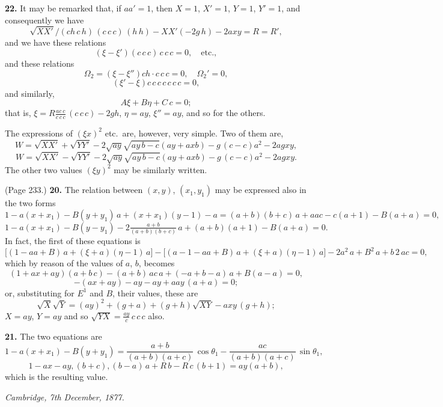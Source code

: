 \documentclass[11pt,a4paper]{book}
\begin{document}
\medskip

\noindent\textbf{22.} It may be remarked that, if $a a' = 1$, then $X = 1$, $X' = 1$, $Y = 1$, $Y' = 1$, and consequently we have
\[
\sqrt{X X'}/(c h\,c\,h)\,(c\,c\,c)\,(h\,h) - X X' (- 2 g\,h) - 2 a x y = R = R',
\]
and we have these relations
\[
(\xi - \xi')(c\,c\,c)\,c\,c\,c = 0, \quad \text{etc.},
\]
and these relations
\[
\Omega_2 = (\xi - \xi'') c h \cdot c\,c\,c = 0, \quad \Omega_2' = 0,
\]
\[
(\xi' - \xi) c\,c\,c\,c\,c\,c\,c = 0,
\]
and similarly,
\[
A\xi + B \eta + C\,c = 0;
\]
that is, $\xi = R \frac{a c\,c}{c\,c\,c}\,(c\,c\,c) - 2 g h$, $\eta = a y$, $\xi'' = a y$, and so for the others.

The expressions of $(\xi x)^2$ etc.\ are, however, very simple. Two of them are,
\[
W = \sqrt{X X'} + \sqrt{Y Y'} - 2 \sqrt{a y}\sqrt{a y\,b - c} (a y + a x b) - g\,(c - c) a^2 - 2 a g x y,
\]
\[
W = \sqrt{X X'} - \sqrt{Y Y'} - 2 \sqrt{a y}\sqrt{a y\,b - c} (a y + a x b) - g\,(c - c) a^2 - 2 a g x y.
\]
The other two values $(\xi y)^2$ may be similarly written.

\medskip

\noindent (Page 233.) \textbf{20.} The relation between $(x, y)$, $(x_1, y_1)$ may be expressed also in the two forms
\[
1 - a (x + x_1) - B (y + y_1)\, a + (x + x_1)(y - 1) - a = (a + b)(b + c)\,a + a a c - c (a + 1) - B(a + a) = 0,
\]
\[
1 - a (x + x_1) - B (y - y_1) - 2 \tfrac{a + b}{(a + b)(b + c)}\,a + (a + b)(a + 1) - B (a + a) = 0.
\]
In fact, the first of these equations is
\[
\big[(1 - aa + B)\,a + (\xi + a)(\eta - 1)\,a\big] - \big[(a - 1 - a a + B)\,a + (\xi + a)(\eta - 1)\,a\big] - 2 a^2\,a + B^2\,a + b\,2\,a c = 0,
\]
which by reason of the values of $a$, $b$, becomes
\[
(1 + a x + a y)(a + b\,c) - (a + b)\,a c\,a + (- a + b - a)\,a + B (a - a) = 0,
\]
\[
- (a x + a y) - a y - a y + a a y\,(a + a) = 0;
\]
or, substituting for $E^1$ and $B$, their values, these are
\[
\sqrt{X}\sqrt{Y} = (a y)^2 + (g + a) + (g + h)\sqrt{X Y} - a x y\,(g + h);
\]
$X = a y$, $Y = a y$ and so $\sqrt{Y X} = \tfrac{a y}{c}\,c\,c\,c$ also.

\medskip

\noindent\textbf{21.} The two equations are
\[
1 - a(x + x_1) - B (y + y_1) = \frac{a + b}{(a + b)(a + c)}\,\cos\theta_1 - \frac{a c}{(a + b)(a + c)}\,\sin\theta_1,
\]
\[
1 - a x - a y, (b + c), (b - a)\,a + R\,b - R\,c\,(b + 1) = a y(a + b),
\]
which is the resulting value.

\medskip

\noindent\textit{Cambridge, 7th December, 1877.}
\end{document}
